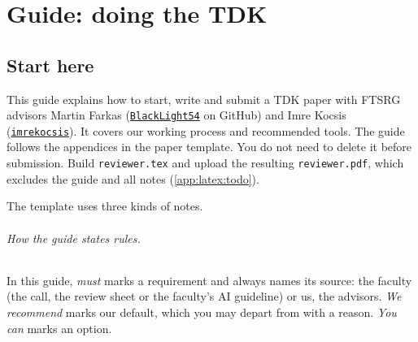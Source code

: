 \part*{Guide: doing the TDK}
\chapter{Start here}\label{app:here}
This guide explains how to start, write and submit a TDK paper with FTSRG advisors Martin Farkas (\href{https://github.com/BlackLight54}{\texttt{BlackLight54}} on GitHub) and Imre Kocsis (\href{https://github.com/imrekocsis}{\texttt{imrekocsis}}). It covers our working process and recommended tools.
The guide follows the appendices in the paper template. You do not need to delete it before submission. Build \texttt{reviewer.tex} and upload the resulting \texttt{reviewer.pdf}, which excludes the guide and all notes (\cref{app:latex:todo}).

The template uses three kinds of notes. 

\paragraph{How the guide states rules.}\label{app:here:words} In this guide, \emph{must} marks a requirement and always names its source: the faculty (the call, the review sheet or the faculty's AI guideline) or us, the advisors. \emph{We recommend} marks our default, which you may depart from with a reason. \emph{You can} marks an option.

